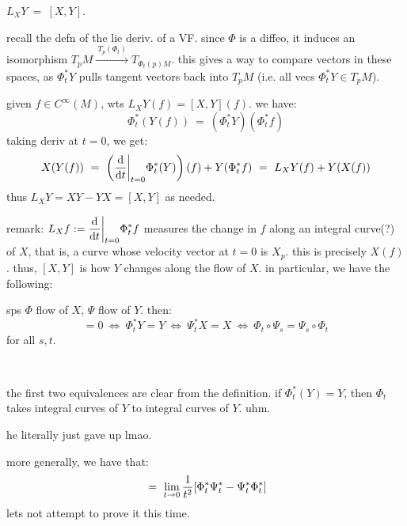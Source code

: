 \begin{thm}
	$L_{X}Y \ = \ [X,Y]$.
\end{thm}

recall the defn of the lie deriv. of a VF.
since $\Phi$ is a diffeo, it induces an isomorphism
$T_{p}M\xrightarrow{ \ T_{p}(\Phi_{t}) \ }T_{\Phi_{t}(p)M}$.
this gives a way to compare vectors in these spaces, as $\Phi_{t}^{*}Y$ pulls
tangent vectors back into $T_{p}M$ (i.e. all vecs $\Phi_{t}^{*}Y\in T_{p}M$).

\begin{pf}[]
	[of 8.10] given $f\in C^{\infty}(M)$, wts $L_{X}Y(f)=[X,Y](f)$. we have:
	\begin{equation*}
		\Phi_{t}^{*}(Y(f)) \ = \ (\Phi_{t}^{*}Y)(\Phi_{t}^{*}f)
	\end{equation*}
	taking deriv at $t=0$, we get:
	\begin{equation*}
		X(Y(f)) \ = \
		\left(\frac{\textrm{d}}{\textrm{d} t}\bigg\rvert_{t=0}\Phi_{t}^{*}(Y)\right)(f)
		+ Y(\Phi_{t}^{*}f)
		\ = \ L_{X}Y(f) + Y(X(f))
	\end{equation*}
	thus $L_{X}Y=XY-YX=[X,Y]$ as needed.
\end{pf}
remark: $L_{X}f:=\displaystyle\frac{\textrm{d}}{\textrm{d} t}\bigg\rvert_{t=0}\Phi_{t}^{*}f$
measures the change in $f$ along an integral curve(?) of $X$, that is,
a curve whose velocity vector at $t=0$ is $X_{p}$.
this is precisely $X(f)$.
thus, $[X,Y]$ is how $Y$ changes along the flow of $X$.
in particular, we have the following:

\begin{thm}
	sps $\Phi$ flow of $X$, $\Psi$ flow of $Y$. then:
	\begin{equation*}
		[X,Y]=0 \ \iff \ \Phi_{t}^{*}Y = Y \ \iff \ \Psi_{t}^{*}X = X
		\ \iff \ \Phi_{t}\circ\Psi_{s} = \Psi_{s}\circ\Phi_{t}
	\end{equation*}
	for all $s,t$.
\end{thm} \

\begin{pf}
	the first two equivalences are clear from the definition.
	if $\Phi_{t}^{*}(Y)=Y$, then $\Phi_{t}$ takes integral curves of $Y$ to
	integral curves of $Y$. uhm.
	
	he literally just gave up lmao.
\end{pf}
more generally, we have that:
\begin{equation*}
	[X,Y] \ = \ \lim_{t\sto0}\frac{1}{t^{2}}[\Phi_{t}^{*}\Psi_{t}^{*}-\Psi_{t}^{*}\Phi_{t}^{*}]
\end{equation*}
lets not attempt to prove it this time.

